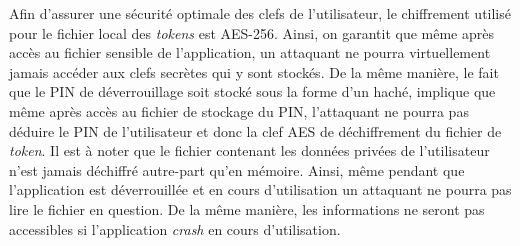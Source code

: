 Afin d'assurer une sécurité optimale des clefs de l'utilisateur, le chiffrement utilisé pour
le fichier local des \emph{tokens} est AES-256. Ainsi, on garantit que même après accès au
fichier sensible de l'application, un attaquant ne pourra virtuellement jamais accéder aux
clefs secrètes qui y sont stockés. De la même manière, le fait que le PIN de déverrouillage
soit stocké sous la forme d'un haché, implique que même après accès au fichier de stockage du
PIN, l'attaquant ne pourra pas déduire le PIN de l'utilisateur et donc la clef AES de déchiffrement du fichier de \emph{token}. Il est à noter que le fichier contenant les données
privées de l'utilisateur n'est jamais déchiffré autre-part qu'en mémoire. Ainsi, même pendant
que l'application est déverrouillée et en cours d'utilisation un attaquant ne pourra pas lire
le fichier en question. De la même manière, les informations ne seront pas accessibles si
l'application \emph{crash} en cours d'utilisation.




